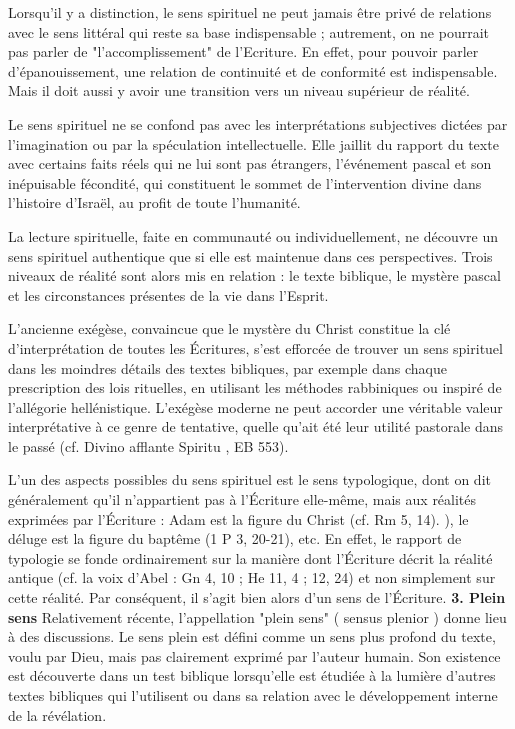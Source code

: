 Lorsqu'il y a distinction, le sens spirituel ne peut jamais être privé de relations avec le sens littéral qui reste sa base indispensable ; autrement, on ne pourrait pas parler de "l'accomplissement" de l'Ecriture. En effet, pour pouvoir parler d'épanouissement, une relation de continuité et de conformité est indispensable. Mais il doit aussi y avoir une transition vers un niveau supérieur de réalité.

Le sens spirituel ne se confond pas avec les interprétations subjectives dictées par l'imagination ou par la spéculation intellectuelle. Elle jaillit du rapport du texte avec certains faits réels qui ne lui sont pas étrangers, l'événement pascal et son inépuisable fécondité, qui constituent le sommet de l'intervention divine dans l'histoire d'Israël, au profit de toute l'humanité.

La lecture spirituelle, faite en communauté ou individuellement, ne découvre un sens spirituel authentique que si elle est maintenue dans ces perspectives. Trois niveaux de réalité sont alors mis en relation : le texte biblique, le mystère pascal et les circonstances présentes de la vie dans l'Esprit.

L'ancienne exégèse, convaincue que le mystère du Christ constitue la clé d'interprétation de toutes les Écritures, s'est efforcée de trouver un sens spirituel dans les moindres détails des textes bibliques, par exemple dans chaque prescription des lois rituelles, en utilisant les méthodes rabbiniques ou inspiré de l'allégorie hellénistique. L'exégèse moderne ne peut accorder une véritable valeur interprétative à ce genre de tentative, quelle qu'ait été leur utilité pastorale dans le passé (cf. Divino afflante Spiritu , EB 553).

L'un des aspects possibles du sens spirituel est le sens typologique, dont on dit généralement qu'il n'appartient pas à l'Écriture elle-même, mais aux réalités exprimées par l'Écriture : Adam est la figure du Christ (cf. Rm 5, 14). ), le déluge est la figure du baptême (1 P 3, 20-21), etc. En effet, le rapport de typologie se fonde ordinairement sur la manière dont l'Écriture décrit la réalité antique (cf. la voix d'Abel : Gn 4, 10 ; He 11, 4 ; 12, 24) et non simplement sur cette réalité. Par conséquent, il s'agit bien alors d'un sens de l'Écriture. 
\textbf{
3. Plein sens  
}
Relativement récente, l'appellation "plein sens" ( sensus plenior ) donne lieu à des discussions. Le sens plein est défini comme un sens plus profond du texte, voulu par Dieu, mais pas clairement exprimé par l'auteur humain. Son existence est découverte dans un test biblique lorsqu'elle est étudiée à la lumière d'autres textes bibliques qui l'utilisent ou dans sa relation avec le développement interne de la révélation.

